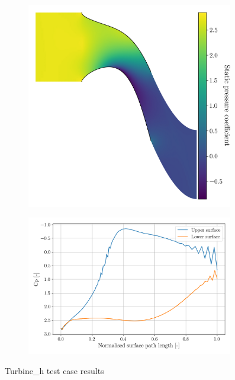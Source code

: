 \documentclass{article}
\begin{document}
\begin{figure}[H]
    \centering
    \begin{subfigure}{0.44\textwidth}
        \centering
        \includegraphics[width=0.99\textwidth]{figures/turbine_h_cp.png}
        \caption{}
        \label{fig:turbine_h_cp}
    \end{subfigure}
    \begin{subfigure}{0.55\textwidth}
        \centering
        \includegraphics[width=0.99\textwidth]{figures/turbine_h_surface_cp.png}
        \caption{}
        \label{fig:turbine_h_surface_cp}
    \end{subfigure}
    \caption{Turbine\_h test case results}
\end{figure}
\end{document}
